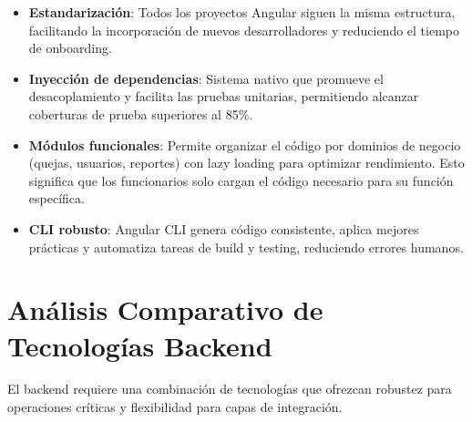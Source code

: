 \begin{itemize}
    \item \textbf{Estandarización}: Todos los proyectos Angular siguen la misma estructura, facilitando la incorporación de nuevos desarrolladores y reduciendo el tiempo de onboarding.
    
    \item \textbf{Inyección de dependencias}: Sistema nativo que promueve el desacoplamiento y facilita las pruebas unitarias, permitiendo alcanzar coberturas de prueba superiores al 85\%.
    
    \item \textbf{Módulos funcionales}: Permite organizar el código por dominios de negocio (quejas, usuarios, reportes) con lazy loading para optimizar rendimiento. Esto significa que los funcionarios solo cargan el código necesario para su función específica.
    
    \item \textbf{CLI robusto}: Angular CLI genera código consistente, aplica mejores prácticas y automatiza tareas de build y testing, reduciendo errores humanos.
\end{itemize}

\section{Análisis Comparativo de Tecnologías Backend}

El backend requiere una combinación de tecnologías que ofrezcan robustez para operaciones críticas y flexibilidad para capas de integración.

